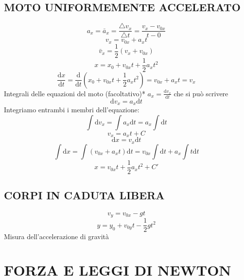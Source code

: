\documentclass{article}
\begin{document}
		\subsection{MOTO UNIFORMEMENTE ACCELERATO}
			\[ a_x = \bar a_x = \frac{\triangle v_x}{ \triangle t} = \frac{ v_x - v_{0x} }{ t - 0 } \]
			\begin{equation} v_x = v_{0x} + a_x t \end{equation}
			\begin{equation} \bar v_x = \frac{1}{2} ( v_x + v_{0x} ) \end{equation}
			\begin{equation} x = x_0 + v_{0x} t + \frac{1}{2} a_x t^2 \end{equation}
			\[ \frac{\mathrm d x}{\mathrm d t} = \frac{\mathrm d}{\mathrm d t} ( x_0 + v_{0x} t + \frac{1}{2} a_x t^2 ) = v_{0x} + a_x t = v_x \]
			Integrali delle equazioni del moto (facoltativo)*
			$ a_x = \frac{\mathrm d v_x}{\mathrm d t} $ che si può scrivere
			\[ \mathrm d v_x = a_x \mathrm d t \]
			Integriamo entrambi i membri dell'equazione:
			\[ \int \mathrm d v_x = \int a_x \mathrm d t =  a_x \int \mathrm d t \]
			\[ v_x = a_x t + C \]
			\[ \mathrm d x = v_x \mathrm d t \]
			\[ \int \mathrm d x = \int ( v_{0x} + a_x t ) \mathrm d t = v_{0x} \int \mathrm d t + a_x \int t \mathrm d t \]
			\[ x = v_{0x} t + \frac{1}{2} a_x t^2 + C'\]
		\subsection{CORPI IN CADUTA LIBERA}
			\begin{equation} v_y = v_{0x} - g t \end{equation}
			\begin{equation} y = y_0 + v_{0y} t - \frac{1}{2} g t^2 \end{equation}
			Misura dell'accelerazione di gravità

	\section{FORZA E LEGGI DI NEWTON}

\begin{comment}
			\begin{equation}  \end{equation}
			\begin{equation}  \end{equation}
			\begin{equation}  \end{equation}
			\begin{equation}  \end{equation}
			\begin{equation}  \end{equation}
			\begin{equation}  \end{equation}
\end{comment}
\end{document}
